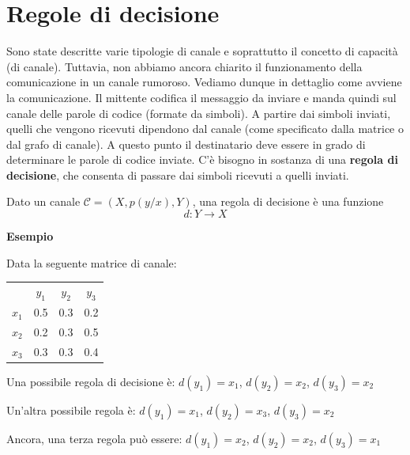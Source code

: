 \section{Regole di decisione}
Sono state descritte varie tipologie di canale e soprattutto il concetto di capacità (di canale). Tuttavia, non abbiamo ancora chiarito 
il funzionamento della comunicazione in un canale rumoroso. Vediamo dunque in dettaglio come avviene la comunicazione.
Il mittente codifica il messaggio da inviare e manda quindi sul canale delle parole di codice (formate da simboli).
A partire dai simboli inviati, quelli che vengono ricevuti dipendono dal canale (come specificato dalla matrice o dal grafo di canale).
A questo punto il destinatario deve essere in grado di determinare le parole di codice inviate.
C'è bisogno in sostanza di una \textbf{regola di decisione}, che consenta di passare dai simboli ricevuti a quelli inviati.

\begin{definizione}
 Dato un canale $\mathcal{C}=(X,p(y/x),Y)$, una regola di decisione è una funzione
 \[
  d: Y \to X
 \]
\end{definizione}

\noindent
\textbf{Esempio}

\noindent
Data la seguente matrice di canale:

\begin{table}[htbp]
  \begin{center}
   \begin{tabular}{c c c c}
	& $y_1$ & $y_2$ & $y_3$ \\
	$x_1$ & 0.5 & 0.3 & 0.2 \\ 
	$x_2$ & 0.2 & 0.3 & 0.5  \\ 
	$x_3$ & 0.3 & 0.3 & 0.4  \\ 
    \end{tabular}
  \end{center}
\end{table}

\noindent
Una possibile regola di decisione è:
$d(y_1)=x_1$, 
$d(y_2)=x_2$, 
$d(y_3)=x_2$

\noindent
Un'altra possibile regola è:
$d(y_1)=x_1$, 
$d(y_2)=x_3$, 
$d(y_3)=x_2$

\noindent
Ancora, una terza regola può essere:
$d(y_1)=x_2$, 
$d(y_2)=x_2$, 
$d(y_3)=x_1$

\bigskip

